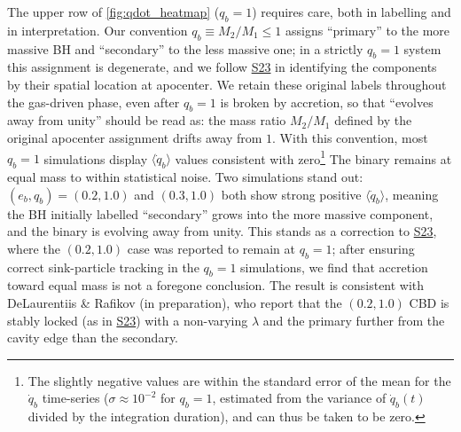 \documentclass[fleqn,usenatbib]{mnras}
\newcommand{\Stwentythree}{\href{https://doi.org/10.1093/mnras/stac3263}{S23}\xspace}
\begin{document}
The upper row of \autoref{fig:qdot_heatmap} ($q_b = 1$) requires care, both in labelling and in interpretation. Our convention $q_b \equiv M_2/M_1 \leq 1$ assigns ``primary'' to the more massive BH and ``secondary'' to the less massive one; in a strictly $q_b = 1$ system this assignment is degenerate, and we follow \Stwentythree in identifying the components by their spatial location at apocenter. We retain these original labels throughout the gas-driven phase, even after $q_b = 1$ is broken by accretion, so that ``evolves away from unity'' should be read as: the mass ratio $M_2/M_1$ defined by the original apocenter assignment drifts away from $1$. With this convention, most $q_b = 1$ simulations display $\langle \dot{q}_b \rangle$ values consistent with zero\footnote{The slightly negative values are within the standard error of the mean for the $\dot{q}_b$ time-series ($\sigma \approx 10^{-2}$ for $q_b = 1$, estimated from the variance of $\dot{q}_b(t)$ divided by the integration duration), and can thus be taken to be zero.} The binary remains at equal mass to within statistical noise. Two simulations stand out: $(e_b, q_b) = (0.2, 1.0)$ and $(0.3, 1.0)$ both show strong positive $\langle \dot{q}_b \rangle$, meaning the BH initially labelled ``secondary'' grows into the more massive component, and the binary is evolving away from unity. This stands as a correction to \Stwentythree, where the $(0.2, 1.0)$ case was reported to remain at $q_b = 1$; after ensuring correct sink-particle tracking in the $q_b = 1$ simulations, we find that accretion toward equal mass is not a foregone conclusion. The result is consistent with DeLaurentiis \& Rafikov (in preparation), who report that the $(0.2, 1.0)$ CBD is stably locked (as in \Stwentythree) with a non-varying $\lambda$ and the primary further from the cavity edge than the secondary.
\end{document}
